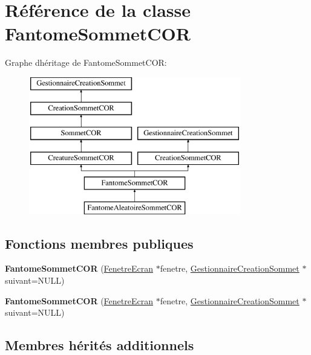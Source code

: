 \hypertarget{class_fantome_sommet_c_o_r}{}\section{Référence de la classe Fantome\+Sommet\+C\+OR}
\label{class_fantome_sommet_c_o_r}
Graphe d\textquotesingle{}héritage de Fantome\+Sommet\+C\+OR\+:\begin{figure}[H]
\begin{center}
\leavevmode
\includegraphics[height=6.000000cm]{class_fantome_sommet_c_o_r}
\end{center}
\end{figure}
\subsection*{Fonctions membres publiques}
\begin{DoxyCompactItemize}
\item 
\mbox{\label{class_fantome_sommet_c_o_r_a9caa257adb06e2389b90fc2e0b4e7c96}} 
{\bfseries Fantome\+Sommet\+C\+OR} (\mbox{\hyperlink{class_fenetre_ecran}{Fenetre\+Ecran}} $\ast$fenetre, \mbox{\hyperlink{class_gestionnaire_creation_sommet}{Gestionnaire\+Creation\+Sommet}} $\ast$suivant=N\+U\+LL)
\item 
\mbox{\label{class_fantome_sommet_c_o_r_a9caa257adb06e2389b90fc2e0b4e7c96}} 
{\bfseries Fantome\+Sommet\+C\+OR} (\mbox{\hyperlink{class_fenetre_ecran}{Fenetre\+Ecran}} $\ast$fenetre, \mbox{\hyperlink{class_gestionnaire_creation_sommet}{Gestionnaire\+Creation\+Sommet}} $\ast$suivant=N\+U\+LL)
\end{DoxyCompactItemize}
\subsection*{Membres hérités additionnels}


